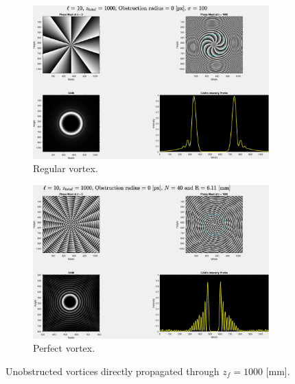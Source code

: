 \begin{figure}[htbp]
    \centering
    \begin{subfigure}[b]{0.45\textwidth}
        \centering
        \includegraphics[width=\textwidth]{images/c04/type=0_r=0_zi=0_zf=1000.eps}
        \caption{Regular vortex.}
    \end{subfigure}
    \hfill
    \begin{subfigure}[b]{0.45\textwidth}
        \centering
        \includegraphics[width=\textwidth]{images/c04/type=1_r=0_zi=0_zf=1000.eps}
        \caption{Perfect vortex.}
    \end{subfigure}
    \caption{Unobstructed vortices directly propagated through $z_f = 1000$ [mm].}
    \label{fig:Vortices_r=0_z=1000}
\end{figure}

